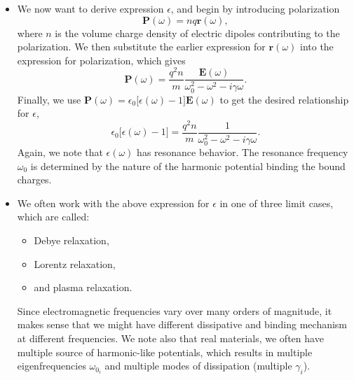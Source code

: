 \documentclass[11pt, a4paper]{article}
\renewcommand{\vec}[1]{\bm{#1}} %
\renewcommand{\r}{\vec{r}}
\newcommand{\E}{\vec{E}} %
\renewcommand{\P}{\vec{P}}  %
\newcommand{\ee}{\epsilon_{0}}  %
\begin{document}
\begin{itemize}
    \item We now want to derive expression $ \epsilon $, and begin by introducing polarization
    \begin{equation*}
        \P(\omega) = nq\r(\omega),
    \end{equation*}
    where $ n $ is the volume charge density of electric dipoles contributing to the polarization. We then substitute the earlier expression for $ \r(\omega) $ into the expression for polarization, which gives
    \begin{equation*}
        \P(\omega) = \frac{q^{2}n}{m} \frac{\E(\omega)}{\omega_{0}^{2} - \omega^{2} - i \gamma \omega}.
    \end{equation*}
    Finally, we use $ \P(\omega) = \ee \big[ \epsilon(\omega)-1 \big]\E(\omega) $ to get the desired relationship for $ \epsilon $,
    \begin{equation*}
        \ee \big[ \epsilon(\omega) -1 \big] = \frac{q^{2}n}{m} \frac{1}{\omega_{0}^{2} - \omega^{2} - i\gamma\omega}. 
    \end{equation*}
    Again, we note that $ \epsilon(\omega) $ has resonance behavior. The resonance frequency $ \omega_{0} $ is determined by the nature of the harmonic potential binding the bound charges.
    
    \item We often work with the above expression for $ \epsilon $ in one of three limit cases, which are called:
    \begin{itemize}
        \item Debye relaxation,

        \item Lorentz relaxation,

        \item and plasma relaxation.
    \end{itemize}
    Since electromagnetic frequencies vary over many orders of magnitude, it makes sense that we might have different dissipative and binding mechanism at different frequencies. We note also that real materials, we often have multiple source of harmonic-like potentials, which results in multiple eigenfrequencies $ \omega_{0_{i}} $ and multiple modes of dissipation (multiple $ \gamma_{i} $).

    
\end{itemize}
\end{document}
